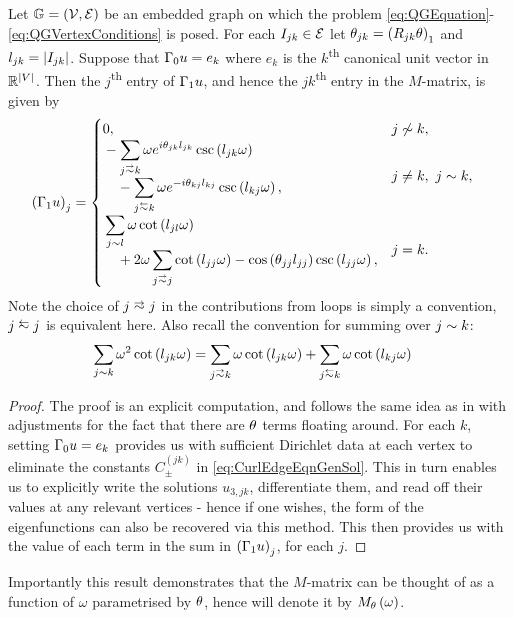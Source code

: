 \begin{prop} \label{prop:M-MatrixEntries}
	Let $\mathbb{G}=\left( \mathcal{V},\mathcal{E} \right)$ be an embedded graph on which the problem \eqref{eq:QGEquation}-\eqref{eq:QGVertexConditions} is posed.
	For each $I_{jk}\in \mathcal{E}$ let $\theta_{jk} = \left( R_{jk}\theta \right)_1$ and $l_{jk} = \left\lvert I_{jk} \right\rvert$.
	Suppose that $\Gamma_0 u = e_k$ where $e_k$ is the $k$\textsuperscript{th} canonical unit vector in $\mathbb{R}^{\left\lvert V \right\rvert}$.
	Then the $j$\textsuperscript{th} entry of $\Gamma_1 u$, and hence the $jk$\textsuperscript{th} entry in the $M$-matrix, is given by
	\begin{align*}
		\bracs{\nmap u}_j &= 
		\begin{cases}
			\!\begin{aligned}
				&0,
			\end{aligned}			
			& j \not\con k, \\
			\!\begin{aligned}
				&-\sum_{j\conLeft k} \omega e^{i\qm_{jk}l_{jk}} \csc\bracs{l_{jk}\omega} 
				\\ &\quad - \sum_{j\conRight k} \omega e^{-i\qm_{kj}l_{kj}} \csc\bracs{l_{kj}\omega},
			\end{aligned}
			& j\neq k, \ j\con k, \\
			\!\begin{aligned}
				&\sum_{j\con l} \omega\cot\bracs{l_{jl}\omega}
				\\ &\quad + 2\omega\sum_{j\conLeft j} \cot\bracs{l_{jj}\omega} - \cos\bracs{\qm_{jj}l_{jj}}\csc\bracs{l_{jj}\omega},
			\end{aligned}
			& j=k.
		\end{cases}
	\end{align*}
	Note the choice of $j\conLeft j$ in the contributions from loops is simply a convention, $j\conRight j$ is equivalent here.
	Also recall the convention for summing over $j\sim k$:
	\begin{align*}
		\sum_{j\con k} \omega^2\cot\bracs{l_{jk}\omega} &= \sum_{j\conLeft k} \omega\cot\bracs{l_{jk}\omega}	+ \sum_{j\conRight k} \omega\cot\bracs{l_{kj}\omega}
	\end{align*}
\end{prop}
\begin{proof}
	The proof is an explicit computation, and follows the same idea as in \cite{ershova2014isospectrality} with adjustments for the fact that there are $\theta$ terms floating around.
	For each $k$, setting $\Gamma_0 u = e_k$ provides us with sufficient Dirichlet data at each vertex to eliminate the constants $C^{(jk)}_{\pm}$ in \eqref{eq:CurlEdgeEqnGenSol}.
	This in turn enables us to explicitly write the solutions $u_{3,jk}$, differentiate them, and read off their values at any relevant vertices - hence if one wishes, the form of the eigenfunctions can also be recovered via this method.
	This then provides us with the value of each term in the sum in $\left( \Gamma_1 u \right)_j$, for each $j$.
\end{proof}
Importantly this result demonstrates that the $M$-matrix can be thought of as a function of $\omega$ parametrised by $\theta$, hence will denote it by $M_{\theta}\left( \omega \right)$.